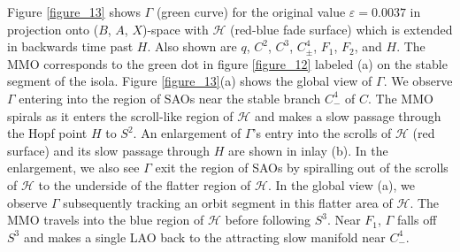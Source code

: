 \documentclass{ws-ijbc}
\begin{document}
Figure \ref{figure_13} shows $\Gamma$ (green curve) for the original value $\varepsilon=0.0037$ in projection onto ($B$, $A$, $X$)-space with $\mathscr{H}$ (red-blue fade surface) which is extended in backwards time past $H$.  Also shown are $q$, $C^2$, $C^3$, $C^4_\pm$, $F_1$, $F_2$, and $H$.  The MMO corresponds to the green dot in figure \ref{figure_12} labeled (a) on the stable segment of the isola.  Figure \ref{figure_13}(a) shows the global view of $\Gamma$.  We observe $\Gamma$ entering into the region of SAOs near the stable branch $C^4_-$ of $C$.  The MMO spirals as it enters the scroll-like region of $\mathscr{H}$ and makes a slow passage through the Hopf point $H$ to $S^2$.  An enlargement of $\Gamma$'s entry into the scrolls of $\mathscr{H}$ (red surface) and its slow passage through $H$ are shown in inlay (b).  In the enlargement, we also see $\Gamma$ exit the region of SAOs by spiralling out of the scrolls of $\mathscr{H}$ to the underside of the flatter region of $\mathscr{H}$.  In the global view (a), we observe $\Gamma$ subsequently tracking an orbit segment in this flatter area of $\mathscr{H}$.  The MMO travels into the blue region of $\mathscr{H}$ before following $S^3$.  Near $F_1$, $\Gamma$ falls off $S^3$ and makes a single LAO back to the attracting slow manifold near $C^4_-$.
\end{document}
